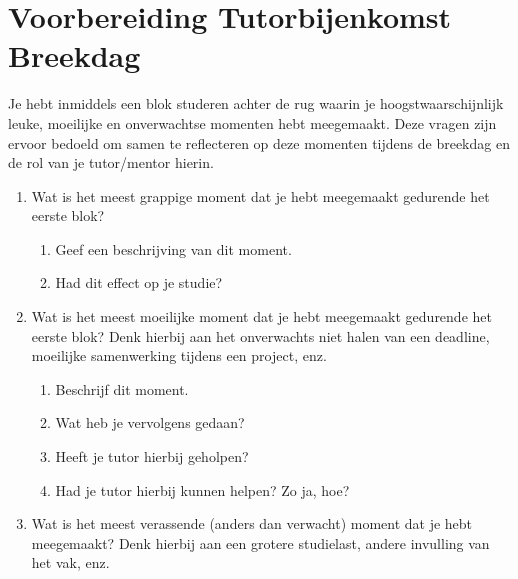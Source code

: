 \chapter{Voorbereiding Tutorbijenkomst Breekdag}

Je hebt inmiddels een blok studeren achter de rug waarin je hoogstwaarschijnlijk leuke, moeilijke en onverwachtse momenten hebt meegemaakt.
Deze vragen zijn ervoor bedoeld om samen te reflecteren op deze momenten tijdens de breekdag en de rol van je tutor/mentor hierin.

\begin{enumerate}

	\item	Wat is het meest grappige moment dat je hebt meegemaakt gedurende het eerste blok?

	\begin{enumerate}

		\item Geef een beschrijving van dit moment.

		\item Had dit effect op je studie?

	\end{enumerate}

      \item Wat is het meest moeilijke moment dat je hebt meegemaakt gedurende het eerste blok?
        Denk hierbij aan het onverwachts niet halen van een deadline, moeilijke samenwerking tijdens een project, enz.

	\begin{enumerate}

		\item Beschrijf dit moment.

		\item Wat heb je vervolgens gedaan?

		\item Heeft je tutor hierbij geholpen?

		\item Had je tutor hierbij kunnen helpen? Zo ja, hoe?

	\end{enumerate}

      \item Wat is het meest verassende (anders dan verwacht) moment dat je hebt meegemaakt?
        Denk hierbij aan een grotere studielast, andere invulling van het vak, enz.

	\begin{enumerate}


\end{enumerate}
\end{enumerate}
